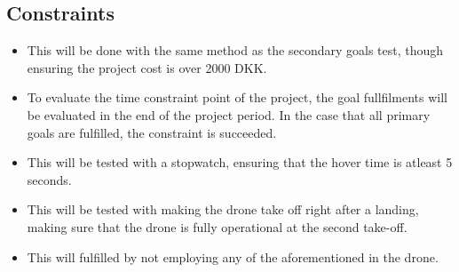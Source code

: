 \subsection{Constraints}
\begin{itemize}
    \item
          This will be done with the same method as the secondary goals test, though ensuring the project cost is over 2000 DKK.
    \item
          To evaluate the time constraint point of the project, the goal fullfilments will be evaluated in the end of the project period. In the case that all primary goals are fulfilled, the constraint is succeeded.
    \item
          This will be tested with a stopwatch, ensuring that the hover time is atleast 5 seconds.
    \item
          This will be tested with making the drone take off right after a landing, making sure that the drone is fully operational at the second take-off.
    \item
          This will fulfilled by not employing any of the aforementioned in the drone.
\end{itemize}